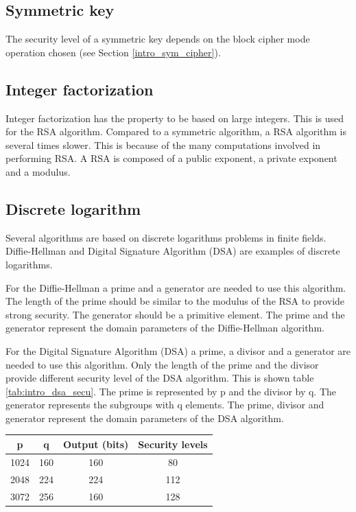 \subsection*{Symmetric key}

The security level of a symmetric key depends on the block cipher mode
operation chosen (see Section \ref{intro_sym_cipher}).

\subsection*{Integer factorization}

Integer factorization has the property to be based on large integers. This is
used for the RSA algorithm.
Compared to a symmetric algorithm, a RSA algorithm is several times slower. This
is because of the many computations involved in performing RSA.
A RSA is composed of a public exponent, a private exponent and a modulus.

\subsection*{Discrete logarithm}

Several algorithms are based on discrete logarithms problems in finite fields.
Diffie-Hellman and Digital Signature Algorithm (DSA) are examples of
discrete logarithms.

For the Diffie-Hellman a prime and a generator are needed to use this algorithm.
The length of the prime should be similar to the modulus of the RSA to provide
strong security. The generator should be a primitive element.
The prime and the generator represent the domain parameters of the
Diffie-Hellman algorithm.

For the Digital Signature Algorithm (DSA) a prime, a divisor and a generator are
needed to use this algorithm. Only the length of the prime and the divisor
provide different security level of the DSA algorithm. This is shown table
\ref{tab:intro_dsa_secu}.
The prime is represented by p and the divisor by q. The generator represents the
subgroups with q elements.
The prime, divisor and generator represent the domain parameters of the DSA
algorithm.\newline

\begin{center}
\begin{tabular}{|*{4}{c|}}

\hline
p		&	q	& Output (bits)	& Security levels \\
\hline
1024	&	160	& 160 			&	80 \\
2048	&	224	& 224 			&	112 \\
3072	&	256	& 160 			& 	128	\\
\hline

\end{tabular}
\label{tab:intro_dsa_secu}

\end{center}

